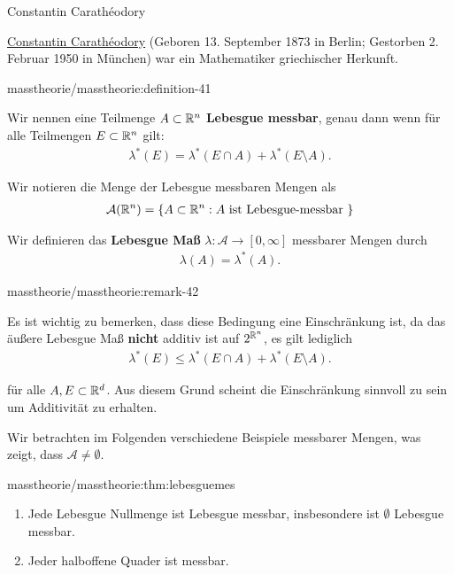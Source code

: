 \begin{emphBox}{Constantin Carathéodory}{}

\par
\href{https://de.wikipedia.org/wiki/Constantin\_Carath\%C3\%A9odory}{Constantin Carathéodory} (Geboren 13. September 1873 in Berlin; Gestorben 2. Februar 1950 in München) war ein Mathematiker griechischer Herkunft.
\end{emphBox}
\begin{definition}{}{masstheorie/masstheorie:definition-41}



\par
Wir nennen eine Teilmenge \(A \subset \mathbb{R}^n\) \textbf{Lebesgue messbar}, genau dann wenn für alle Teilmengen \(E \subset \mathbb{R}^n\) gilt:
\begin{align*}
\lambda^*(E) = \lambda^*(E \cap A) + \lambda^*(E \setminus A).
\end{align*}
\par
Wir notieren die Menge der Lebesgue messbaren Mengen als
\begin{align*}
\mathcal{A}(\mathbb{R}^n) = \lbrace A \subset \mathbb{R}^n : A \text{ ist Lebesgue-messbar } \rbrace
\end{align*}
\par
Wir definieren das \textbf{Lebesgue Maß} \(\lambda \colon \mathcal{A} \rightarrow [0,\infty]\) messbarer Mengen durch
\begin{align*}
\lambda(A) = \lambda^*(A).
\end{align*}\end{definition}
\begin{remark}{}{masstheorie/masstheorie:remark-42}



\par
Es ist wichtig zu bemerken, dass diese Bedingung eine Einschränkung ist, da das äußere Lebesgue Maß \textbf{nicht} additiv ist auf \(2^{\mathbb{R}^n}\), es gilt lediglich
\begin{align*}
\lambda^*(E) \leq \lambda^*(E \cap A) + \lambda^*(E \setminus A).
\end{align*}
\par
für alle \(A,E\subset\mathbb{R}^d\). Aus diesem Grund scheint die Einschränkung sinnvoll zu sein um Additivität zu erhalten.
\end{remark}

\par
Wir betrachten im Folgenden verschiedene Beispiele messbarer Mengen, was zeigt, dass \(\mathcal{A}\neq \emptyset\).
\begin{lemma}{}{masstheorie/masstheorie:thm:lebesguemes}


\begin{enumerate}

\item {} 
\par
Jede Lebesgue Nullmenge ist Lebesgue messbar, insbesondere ist \(\emptyset\) Lebesgue messbar.

\item {} 
\par
Jeder halboffene Quader ist messbar.

\end{enumerate}
\end{lemma}

